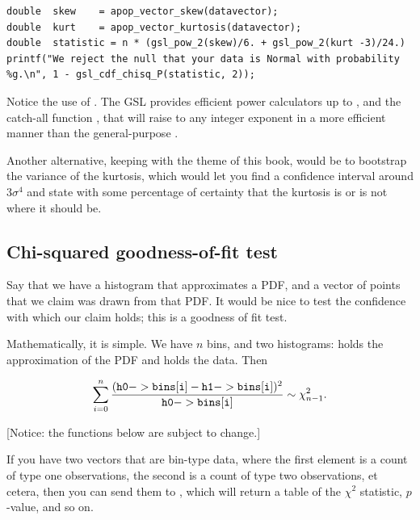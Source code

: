 \begin{lstlisting}
double  skew    = apop_vector_skew(datavector);
double  kurt    = apop_vector_kurtosis(datavector);
double  statistic = n * (gsl_pow_2(skew)/6. + gsl_pow_2(kurt -3)/24.)
printf("We reject the null that your data is Normal with probability %g.\n", 1 - gsl_cdf_chisq_P(statistic, 2));
\end{lstlisting}

Notice the use of . The GSL provides efficient
power calculators up to , and the catch-all function
, that will raise
 to any integer exponent in a more efficient manner than the
general-purpose .

Another alternative, keeping with the theme of this book, would be
to bootstrap the variance of the kurtosis, which would let you find a
confidence interval around $3 \sigma^4$ and state with some percentage
of certainty that the kurtosis is or is not where it should
be.\label{bootkurt}


\subsection{Chi-squared goodness-of-fit test} 
Say that we have a histogram that approximates a PDF, and a vector of
points that we claim was drawn from that PDF. It would be nice to test
the confidence with which our claim holds; this is a goodness
of fit test.

Mathematically, it is simple. We have $n$ bins, and two histograms:
holds the approximation of the PDF and  holds the data. Then 

\begin{equation}    \label{gofstat}
\sum_{i=0}^n {\frac{({\tt h0->bins[i]} - {\tt h1->bins[i]})^2}{{\tt h0->bins[i]}}} \sim \chi^2_{n-1}.
\end{equation}

[Notice: the functions below are subject to change.]

If you have two vectors that are bin-type data, where the first element
is a count of type one observations, the second is a count of type two
observations, et cetera, then you can send them to
, which will return a table
of the $\chi^2$ statistic, $p$-value, and so on.

